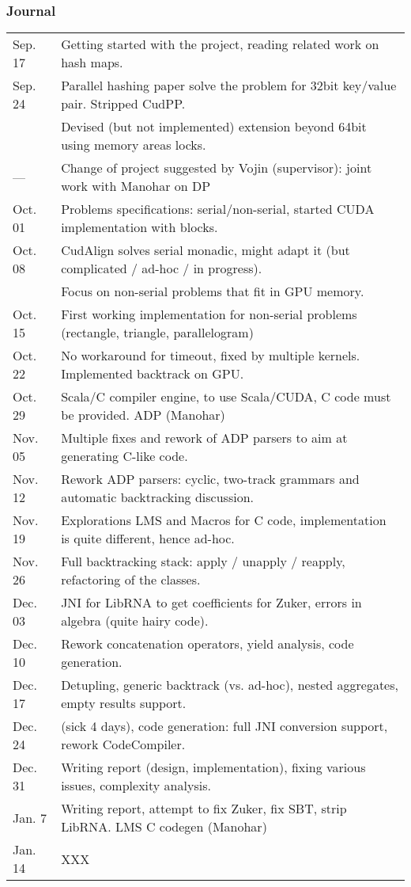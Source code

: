\documentclass[11pt]{article}
\begin{document}
\subsubsection*{Journal}
\begin{tabular}{ll}
Sep. 17	& Getting started with the project, reading related work on hash maps. \\
Sep. 24	& Parallel hashing paper solve the problem for 32bit key/value pair. Stripped CudPP. \\
		& Devised (but not implemented) extension beyond 64bit using memory areas locks. \\
---		& Change of project suggested by Vojin (supervisor): joint work with Manohar on DP \\
Oct. 01	& Problems specifications: serial/non-serial, started CUDA implementation with blocks. \\
Oct. 08	& CudAlign solves serial monadic, might adapt it (but complicated / ad-hoc / in progress). \\
		& Focus on non-serial problems that fit in GPU memory. \\
Oct. 15	& First working implementation for non-serial problems (rectangle, triangle, parallelogram) \\
Oct. 22	& No workaround for timeout, fixed by multiple kernels. Implemented backtrack on GPU. \\
Oct. 29	& Scala/C compiler engine, to use Scala/CUDA, C code must be provided. ADP (Manohar) \\
Nov. 05	& Multiple fixes and rework of ADP parsers to aim at generating C-like code. \\
Nov. 12	& Rework ADP parsers: cyclic, two-track grammars and automatic backtracking discussion. \\
Nov. 19	& Explorations LMS and Macros for C code, implementation is quite different, hence ad-hoc. \\
Nov. 26	& Full backtracking stack: apply / unapply / reapply, refactoring of the classes. \\
Dec. 03	& JNI for LibRNA to get coefficients for Zuker, errors in algebra (quite hairy code). \\
Dec. 10	& Rework concatenation operators, yield analysis, code generation. \\
Dec. 17	& Detupling, generic backtrack (vs. ad-hoc), nested aggregates, empty results support. \\
Dec. 24	& (sick 4 days), code generation: full JNI conversion support, rework CodeCompiler. \\
Dec. 31	& Writing report (design, implementation), fixing various issues, complexity analysis. \\
Jan. 7	& Writing report, attempt to fix Zuker, fix SBT, strip LibRNA. LMS C codegen (Manohar) \\
Jan. 14	& {\color{red} XXX} \\
\end{tabular}
\end{document}
